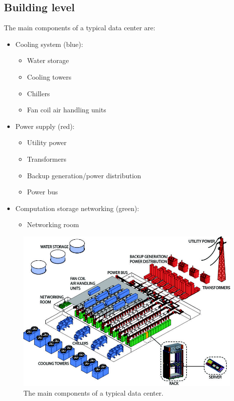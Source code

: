 \subsection{Building level}

The main components of a typical data center are:
\begin{itemize}
	\item Cooling system (blue):
	\begin{itemize}
		\item Water storage
		\item Cooling towers
		\item Chillers
		\item Fan coil air handling units
	\end{itemize}
	
	\item Power supply (red):
	\begin{itemize}
		\item Utility power
		\item Transformers
		\item Backup generation/power distribution
		\item Power bus
	\end{itemize}
	
	\item Computation storage networking (green):
	\begin{itemize}
		\item Networking room
	\end{itemize}
\end{itemize}

\begin{figure}[!htp]
	\centering
	\includegraphics[width=\textwidth]{img/components-dc-1.png}
	\caption{The main components of a typical data center.\cite{barroso2022datacenter}}
\end{figure}

